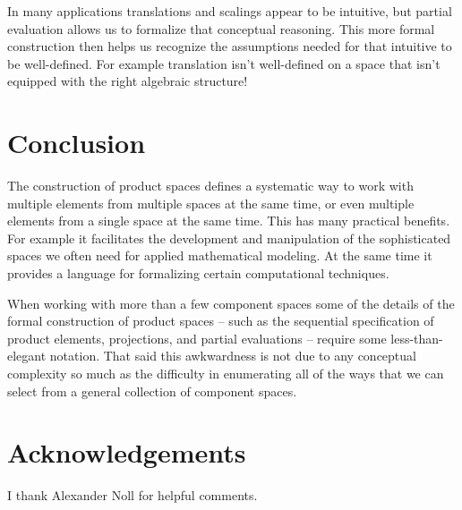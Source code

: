 \documentclass[
  letterpaper,
  DIV=11,
  numbers=noendperiod]{scrartcl}
\begin{document}
In many applications translations and scalings appear to be intuitive,
but partial evaluation allows us to formalize that conceptual reasoning.
This more formal construction then helps us recognize the assumptions
needed for that intuitive to be well-defined. For example translation
isn't well-defined on a space that isn't equipped with the right
algebraic structure!

\hypertarget{conclusion}{%
\section{Conclusion}\label{conclusion}}

The construction of product spaces defines a systematic way to work with
multiple elements from multiple spaces at the same time, or even
multiple elements from a single space at the same time. This has many
practical benefits. For example it facilitates the development and
manipulation of the sophisticated spaces we often need for applied
mathematical modeling. At the same time it provides a language for
formalizing certain computational techniques.

When working with more than a few component spaces some of the details
of the formal construction of product spaces -- such as the sequential
specification of product elements, projections, and partial evaluations
-- require some less-than-elegant notation. That said this awkwardness
is not due to any conceptual complexity so much as the difficulty in
enumerating all of the ways that we can select from a general collection
of component spaces.

\hypertarget{acknowledgements}{%
\section*{Acknowledgements}\label{acknowledgements}}

I thank Alexander Noll for helpful comments.
\end{document}
